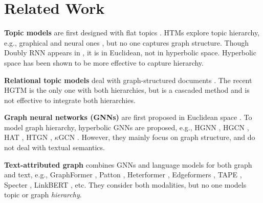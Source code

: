 \section{Related Work}


\textbf{Topic models} are first designed with flat topics \cite{lda,nvdm,prodlda,bertopic,topicgpt,nguyen2024topic,wu2019short,wu2020learning,wu2020short,wu2021discovering,wu2022mitigating,wu2023infoctm,wu2024dynamic,wu2024thesis}. HTMs explore topic hierarchy, e.g., graphical \cite{ncrp,dhtg,wedtm,dirbn,pam,dpfa,gbn,hdp} and neural ones \cite{tsntm,htv,hntm,sawetm,traco,hyhtm}, but no one captures graph structure. Though Doubly RNN appears in \cite{drnn,tsntm,htv}, it is in Euclidean, not in hyperbolic space. Hyperbolic space has been shown to be more effective to capture hierarchy.

\textbf{Relational topic models} deal with graph-structured documents \cite{rtm,nrtm,adjacent_encoder,gtnn,lantm}. %
The recent HGTM \cite{hgtm} is the only one with both hierarchies, but is a cascaded method and is not effective to integrate both hierarchies. %

\textbf{Graph neural networks (GNNs)} are first proposed in Euclidean space \cite{gcn,gat,graphsage}. To model graph hierarchy, hyperbolic GNNs are proposed, e.g., HGNN \cite{hgnn}, HGCN \cite{hgcn}, HAT \cite{hat}, HTGN \cite{htgn}, $\kappa$GCN \cite{kgcn}. However, they mainly focus on graph structure, and do not deal with textual semantics.

\textbf{Text-attributed graph} combines GNNs and language models for both graph and text, e.g., GraphFormer \cite{graphformers}, Patton \cite{patton}, Heterformer \cite{heterformer}, Edgeformers \cite{edgeformers}, TAPE \cite{tape}, Specter \cite{specter}, LinkBERT \cite{linkbert}, etc. They consider both modalities, but no one models topic or graph \emph{hierarchy}. 